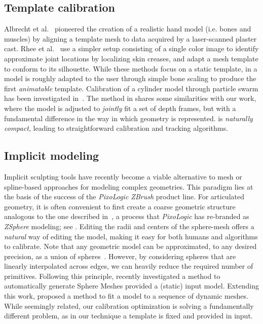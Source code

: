 \subsection*{Template calibration}
Albrecht et al.~\cite{albrecht2003construction} pioneered the creation of a realistic hand model (i.e. bones and muscles) by aligning a template mesh to data acquired by a laser-scanned plaster cast. Rhee et al.~\cite{rhee2006human} use a simpler setup consisting of a single color image to identify approximate joint locations by localizing skin creases, and adapt a mesh template to conform to its silhouette. While these methods focus on a static template, in \cite{delagorce2011model} a model is roughly adapted to the user through simple bone scaling to produce the first \emph{animatable} template. 
% 
Calibration of a cylinder model through particle swarm has been investigated in~\cite{makris2015model}. 
% 
The method in \cite{taylor2014user} shares some similarities with our work, where the model is adjusted to \emph{jointly} fit a set of depth frames, but with a fundamental difference in the way in which geometry is represented.  is \emph{naturally compact}, leading to straightforward calibration and tracking algorithms.

\subsection*{Implicit modeling}
Implicit sculpting tools have recently become a viable alternative to mesh or spline-based approaches for modeling complex geometries. This paradigm lies at the basis of the success of the \emph{PixoLogic ZBrush} product line. 
For articulated geometry, it is often convenient to first create a coarse geometric structure analogous to the one described in~, a process that \emph{PixoLogic} has re-branded as \emph{ZSphere{}} modeling; see . Editing the radii and centers of the sphere-mesh offers a \emph{natural} way of editing the model, making it easy for both humans and algorithms to calibrate.
%
Note that any geometric model can be approximated, to any desired precision, as a union of spheres~\cite{tagliasacchi2016skeletons}. 
However, by considering spheres that are linearly interpolated across edges, we can heavily reduce the required number of primitives. Following this principle, \cite{thiery2013sphere} recently investigated a method to automatically generate Sphere Meshes provided a  (static) input model. Extending this work, \cite{thiery2016spheremesh} proposed a method to fit a model to a sequence of dynamic meshes. 
% 
While seemingly related, our calibration optimization is solving a fundamentally different problem, as in our technique a template is fixed and provided in input.
